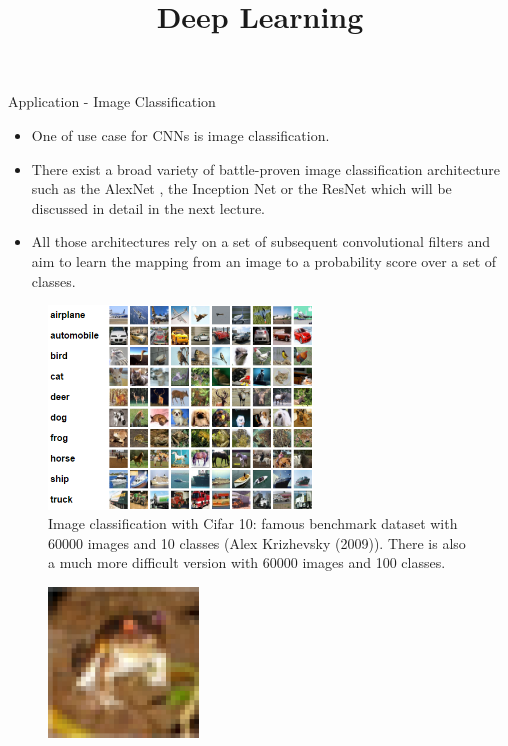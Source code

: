




\newcommand{\titlefigure}{figure/alexnet.jpg}
\newcommand{\learninggoals}{
  \item Appllication
}

\title{Deep Learning}
\date{}




\begin{vbframe}{Application - Image Classification}
    \begin{itemize}
        \item One of use case for CNNs is image classification.
        \item There exist a broad variety of battle-proven image classification architecture such as the AlexNet , the Inception Net or the ResNet which will be discussed in detail in the next lecture.
        \item All those architectures rely on a set of subsequent convolutional filters and aim to learn the mapping from an image to a probability score over a set of classes.
    \end{itemize}
\framebreak
    \begin{figure}
        \centering
        \includegraphics[width=7cm]{figure/recognition.png}
        \caption{Image classification with Cifar 10: famous benchmark dataset with 60000 images and 10 classes (Alex Krizhevsky (2009)). There is also a much more difficult version with 60000 images and 100 classes.}
    \end{figure}
\framebreak
    \begin{figure}
        \centering
        \includegraphics[width=4cm]{figure/cifar_frog.png}

\end{figure}
\end{vbframe}
